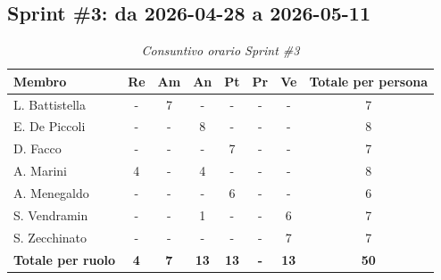 \documentclass[a4paper, 10pt, colorlinks=true, linkcolor=black, urlcolor=blue, citecolor=blue, hidelinks]{article}
\renewcommand{\arraystretch}{1.2}
\begin{document}
\subsection{Sprint \#3: da 2026-04-28 a 2026-05-11}

\begin{table}[H]
    \centering
    \renewcommand{\arraystretch}{1.4}
    \begin{tabular}{|l|c|c|c|c|c|c|c|}
        \hline
        \rowcolor{bluBitless!15}
        \textbf{Membro} & \textbf{Re} & \textbf{Am} & \textbf{An} & \textbf{Pt} & \textbf{Pr} & \textbf{Ve} & \textbf{Totale per persona} \\
        \hline
        L. Battistella & - & 7 & - & - & - & - & 7 \\ \hline
        E. De Piccoli & - & - & 8 & - & - & - & 8 \\ \hline
        D. Facco & - & - & - & 7 & - & - & 7 \\ \hline
        A. Marini & 4 & - & 4 & - & - & - & 8 \\ \hline
        A. Menegaldo & - & - & - & 6 & - & - & 6 \\ \hline
        S. Vendramin & - & - & 1 & - & - & 6 & 7 \\ \hline
        S. Zecchinato & - & - & - & - & - & 7 & 7 \\ \hline
        \rowcolor{bluBitless!8}
        \textbf{Totale per ruolo} & \textbf{4} & \textbf{7} & \textbf{13} & \textbf{13} & \textbf{-} & \textbf{13} & \textbf{50} \\
        \hline
    \end{tabular}
    \caption{\textit{Consuntivo orario Sprint \#3}}
\end{table}
\end{document}
